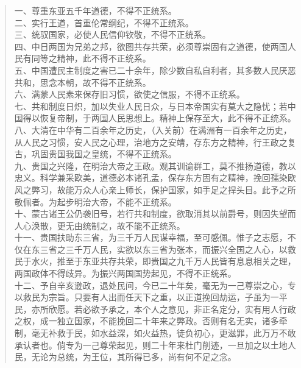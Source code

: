 \begin{quote}
	一、尊重东亚五千年道德，不得不正统系。\\

二、实行王道，首重伦常纲纪，不得不正统系。\\

三、统驭国家，必使人民信仰钦敬，不得不正统系。\\

四、中日两国为兄弟之邦，欲图共存共荣，必须尊崇固有之道德，使两国人民有同等之精神，此不得不正统系。\\

五、中国遭民主制度之害已二十余年，除少数自私自利者，其多数人民厌恶共和，思念本朝，故不得不正统系。\\

六、满蒙人民素来保存旧习惯，欲使之信服，不得不正统系。\\

七、共和制度日炽，加以失业人民日众，与日本帝国实有莫大之隐忧；若中国得以恢复帝制，于两国人民思想上。精神上保存至大，此不得不正统系。\\

八、大清在中华有二百余年之历史，（入关前）在满洲有一百余年之历史，从人民之习惯，安人民之心理，治地方之安靖，存东方之精神，行王政之复古，巩固贵国我国之皇统，不得不正统系。\\

九、贵国之兴隆，在明治大帝之王政。观其训谕群工，莫不推扬道德，教以忠义。科学兼采欧美，道德必本诸孔孟，保存东方固有之精神，挽回孺染欧风之弊习，故能万众人心亲上师长，保护国家，如手足之捍头目。此予之所敬佩者。为起步明治大帝，不能不正统系。\\

十、蒙古诸王公仍袭旧号，若行共和制度，欲取消其以前爵号，则因失望而人心涣散，更无由统制之，故不能不正统系。\\

十一、贵国扶助东三省，为三千万人民谋幸福，至可感佩。惟子之志愿，不仅在东三省之三千万人民，实欲以东三省为张本，而振兴全国之人心，以救民于水火，推至于东亚共存共荣，即贵国之九千万人民皆有息息相关之理，两国政体不得歧异。为振兴两国国势起见，不得不正统系。\\

十二、予自辛亥逊政，退处民间，今已二十年矣，毫无为一己尊崇之心，专以救民为宗旨。只要有人出而任天下之重，以正道挽回劫运，子虽为一平民，亦所欣愿。若必欲予承之，本个人之意见，非正名定分，实有用人行政之权，成一独立国家，不能挽回二十年来之弊政。否则有名无实，诸多牵制，毫无补救于民，如水益深，如火益热，徒负初心，更滋罪，此万万不敢承认者也。倘专为一己尊荣起见，则二十年来杜门削迹，一旦加之以土地人民，无论为总统，为王位，其所得已多，尚有何不足之念。\\
\end{quote}

